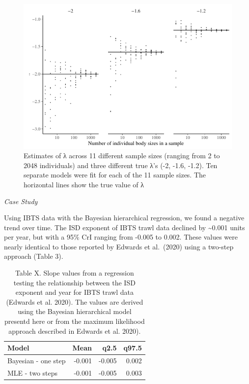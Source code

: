 \documentclass[
  12pt,
]{article}
\begin{document}
\begin{figure}
\centering
\includegraphics{stan_spectra_manuscript_update_files/figure-latex/unnamed-chunk-4-1.pdf}
\caption{Estimates of λ across 11 different sample sizes (ranging from 2
to 2048 individuals) and three different true λ's (-2, -1.6, -1.2). Ten
separate models were fit for each of the 11 sample sizes. The horizontal
lines show the true value of λ}
\end{figure}

\emph{Case Study}

Using IBTS data with the Bayesian hierarchical regression, we found a
negative trend over time. The ISD exponent of IBTS trawl data declined
by \textasciitilde0.001 units per year, but with a 95\% CrI ranging from
-0.005 to 0.002. These values were nearly identical to those reported by
Edwards et al.~(2020) using a two-step approach (Table 3).

\begin{table}

\caption{\label{tab:unnamed-chunk-5}Table X. Slope values from a regression testing the relationship between the ISD exponent and year for IBTS trawl data (Edwards et al. 2020). The values are derived using the Bayesian hierarchical model presentd here or from the maximum likelihood approach described in Edwards et al. 2020).}
\centering
\begin{tabular}[t]{l|r|r|r}
\hline
Model & Mean & q2.5 & q97.5\\
\hline
Bayesian - one step & -0.001 & -0.005 & 0.002\\
\hline
MLE - two steps & -0.001 & -0.005 & 0.003\\
\hline
\end{tabular}
\end{table}
\end{document}
